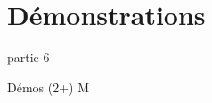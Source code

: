 \section{Démonstrations}

\begin{frame}{partie 6}
  \vspace{0.45cm}
  \begin{pointcle}
    \centering\large
    Démos (2+) M
  \end{pointcle}
\end{frame}

